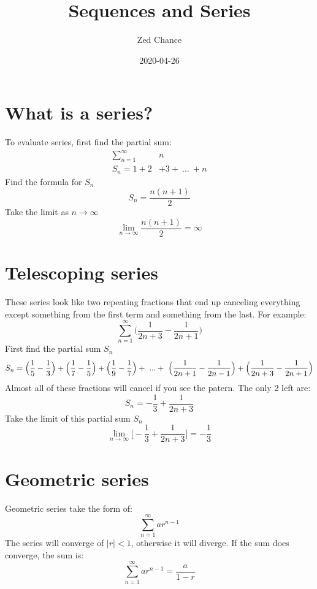 \documentclass{article}
\title{Sequences and Series}
\date{2020-04-26}
\author{Zed Chance}
\begin{document}
\maketitle
\tableofcontents
\newpage

\section{What is a series?}
    To evaluate series, first find the partial sum:
    \begin{align*}
        \sum_{n=1}^\infty & n \\
        S_n = 1 +  2 & + 3 +\  ...\  + n
    \end{align*}
    Find the formula for $S_n$
    $$
    S_n= \frac{n(n+1)}{2}
    $$
    Take the limit as $n \rightarrow \infty$
    $$
    \lim_{n \rightarrow \infty} \frac{n(n+1)}{2} = \infty
    $$

\section{Telescoping series}
    These series look like two repeating fractions that end up canceling everything except something from the first term and something from the last. For example:
    $$
    \sum_{n=1}^{\infty} \Big (\frac{1}{2n+3} - \frac{1}{2n+1}\Big )
    $$
    First find the partial sum $S_n$
    $$
    S_n = \Big ( \frac{1}{5}-\frac{1}{3}\Big ) + \Big ( \frac{1}{7}-\frac{1}{5}\Big ) + \Big ( \frac{1}{9}-\frac{1}{7}\Big ) + \ ...\ \\
    +\ \Big ( \frac{1}{2n+1}-\frac{1}{2n-1}\Big ) + \Big ( \frac{1}{2n+3}-\frac{1}{2n+1}\Big )
    $$
    Almost all of these fractions will cancel if you see the patern. The only 2 left are:
    $$
    S_n = - \frac{1}{3} + \frac{1}{2n+3}
    $$
    Take the limit of this partial sum $S_n$
    $$
    \lim_{n \rightarrow \infty}\big[ - \frac{1}{3} + \frac{1}{2n+3} \big] = - \frac{1}{3}
    $$

\section{Geometric series}
    Geometric series take the form of:
    $$\sum_{n=1}^\infty ar^{n-1}$$
    The series will converge of $\big|r\big|< 1$, otherwise it will diverge.
    If the sum does converge, the sum is:
    $$\sum_{n=1}^\infty ar^{n-1} = \frac{a}{1-r}$$
\end{document}
